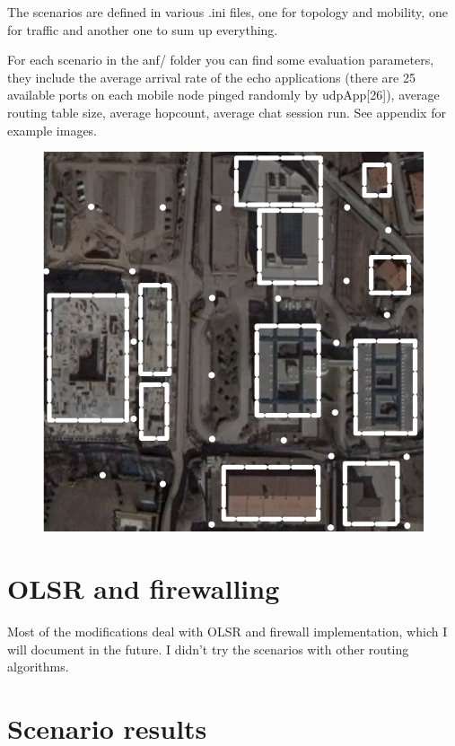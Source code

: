 \documentclass[12pt, a4]{article}
\theoremstyle{definition}
\begin{document}
The scenarios are defined in various .ini files, one for topology and mobility,
one for traffic and another one to sum up everything. 

For each scenario in the anf/ folder you can find some evaluation parameters,
they include the average arrival rate of the echo applications (there are 25
available ports on each mobile node pinged randomly by udpApp[26]), average
routing table size, average hopcount, average chat session run. See appendix for
example images. 


\begin{figure}
\begin{center}
\includegraphics{povo600}
\end{center}
\end{figure}
\section{OLSR and firewalling}

Most of the modifications deal with OLSR and firewall implementation, which I
will document in the future. I didn't try the scenarios with other routing
algorithms.

\appendix
\section{Scenario results}
\end{document}
